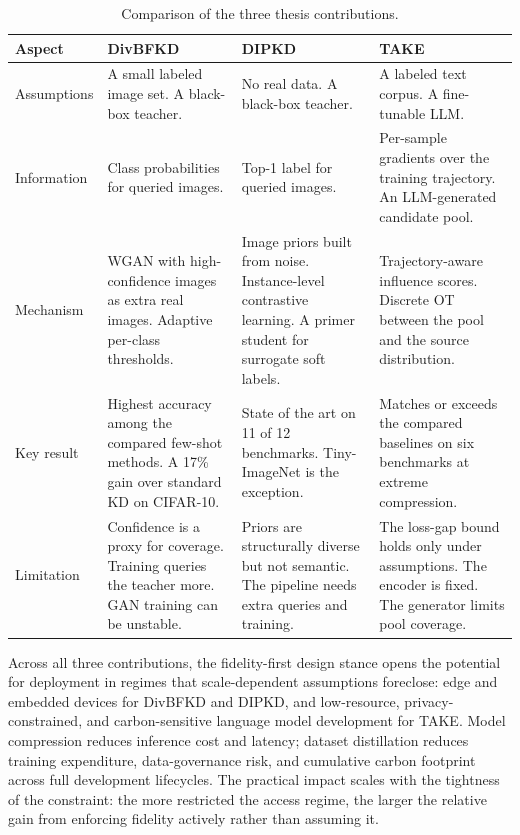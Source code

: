 \begin{table}[ht]
  \centering
  \begin{threeparttable}
    \caption{Comparison of the three thesis contributions.}
    \label{tab:contributions-comparison}
    \setlength{\tabcolsep}{8pt}
    \begin{tabular}{>{\raggedright\arraybackslash}p{2.1cm} >{\raggedright\arraybackslash}p{3.8cm} >{\raggedright\arraybackslash}p{3.8cm} >{\raggedright\arraybackslash}p{3.8cm}}
      \toprule
      \textbf{Aspect} & DivBFKD & DIPKD & TAKE \\
      \midrule
      Assumptions
        & A small labeled image set. A black-box teacher.
        & No real data. A black-box teacher.
        & A labeled text corpus. A fine-tunable \ac{LLM}. \\
      \addlinespace
      Information
        & Class probabilities for queried images.
        & Top-1 label for queried images.
        & Per-sample gradients over the training trajectory. An \ac{LLM}-generated candidate pool. \\
      \addlinespace
      Mechanism
        & WGAN with high-confidence images as extra real images. Adaptive per-class thresholds.
        & Image priors built from noise. Instance-level contrastive learning. A primer student for surrogate soft labels.
        & Trajectory-aware influence scores. Discrete \ac{OT} between the pool and the source distribution. \\
      \addlinespace
      Key result
        & Highest accuracy among the compared few-shot methods. A 17\% gain over standard \ac{KD} on CIFAR-10.
        & State of the art on 11 of 12 benchmarks. Tiny-ImageNet is the exception.
        & Matches or exceeds the compared baselines on six benchmarks at extreme compression. \\
      \addlinespace
      Limitation
        & Confidence is a proxy for coverage. Training queries the teacher more. GAN training can be unstable.
        & Priors are structurally diverse but not semantic. The pipeline needs extra queries and training.
        & The loss-gap bound holds only under assumptions. The encoder is fixed. The generator limits pool coverage. \\
      \bottomrule
    \end{tabular}
  \end{threeparttable}
\end{table}

\begin{foldable}
  Across all three contributions, the fidelity-first design stance opens the potential for deployment in regimes that scale-dependent assumptions foreclose: edge and embedded devices for DivBFKD and DIPKD, and low-resource, privacy-constrained, and carbon-sensitive language model development for TAKE.
  Model compression reduces inference cost and latency; dataset distillation reduces training expenditure, data-governance risk, and cumulative carbon footprint across full development lifecycles.
  The practical impact scales with the tightness of the constraint: the more restricted the access regime, the larger the relative gain from enforcing fidelity actively rather than assuming it.
\end{foldable}

